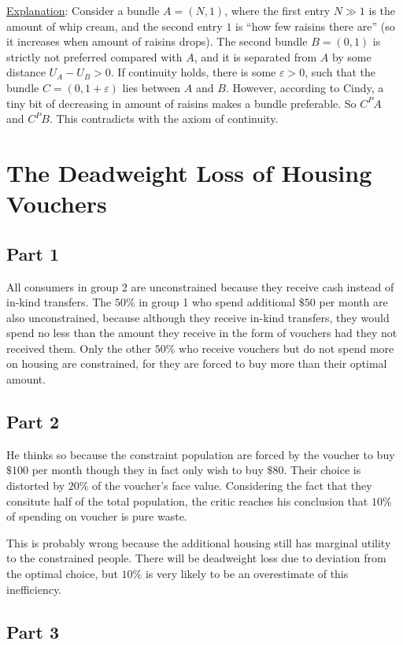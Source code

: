 \documentclass{article}
\begin{document}
\noindent\underline{Explanation}: 
Consider a bundle $A=(N,1)$, where the first entry $N\gg1$ is the amount of whip cream, and the second entry $1$ is ``how few raisins there are'' (so it increases when amount of raisins drops). The second bundle $B=(0,1)$ is strictly not preferred compared with $A$, and it is separated from $A$ by some distance $U_A-U_B>0$. If continuity holds, there is some $\varepsilon>0$, such that the bundle $C=(0,1+\varepsilon)$ lies between $A$ and $B$. However, according to Cindy, a tiny bit of decreasing in amount of raisins makes a bundle preferable. So $C^PA$ and $C^PB$. This contradicts with the axiom of continuity.

\section{The Deadweight Loss of Housing Vouchers}
\subsection{Part 1}
All consumers in group 2 are unconstrained because they receive cash instead of in-kind transfers. The $50\%$ in group 1 who spend additional $\$50$ per month are also unconstrained, because although they receive in-kind transfers, they would spend no less than the amount they receive in the form of vouchers had they not received them. Only the other $50\%$ who receive vouchers but do not spend more on housing are constrained, for they are forced to buy more than their optimal amount.

\subsection{Part 2}
He thinks so because the constraint population are forced by the voucher to buy $\$100$ per month though they in fact only wish to buy $\$80$. Their choice is distorted by $20\%$ of the voucher's face value. Considering the fact that they consitute half of the total population, the critic reaches his conclusion that $10\%$ of spending on voucher is pure waste.

This is probably wrong because the additional housing still has marginal utility to the constrained people. There will be deadweight loss due to deviation from the optimal choice, but $10\%$ is very likely to be an overestimate of this inefficiency.

\subsection{Part 3}
\end{document}
